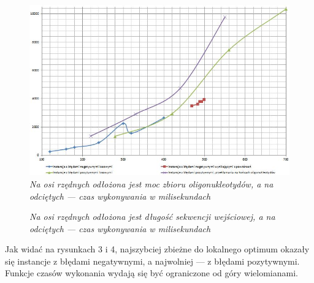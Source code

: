 \documentclass{article}
\begin{document}
\begin{figure}[h]
\center
\includegraphics[scale=0.75]{Przechwytywanie.jpg}
\caption{\textit{Na osi rzędnych odłożona jest moc zbioru oligonukleotydów, a na odciętych --- czas wykonywania w milisekundach}}
\end{figure}

\begin{figure}[H]
\caption{\textit{Na osi rzędnych odłożona jest długość sekwencji wejściowej, a na odciętych --- czas wykonywania w milisekundach}}
\end{figure}

Jak widać na rysunkach 3 i 4, najszybciej zbieżne do lokalnego optimum okazały się instancje z błędami negatywnymi, a najwolniej --- z błędami pozytywnymi.
Funkcje czasów wykonania wydają się być ograniczone od góry wielomianami. %
\end{document}
